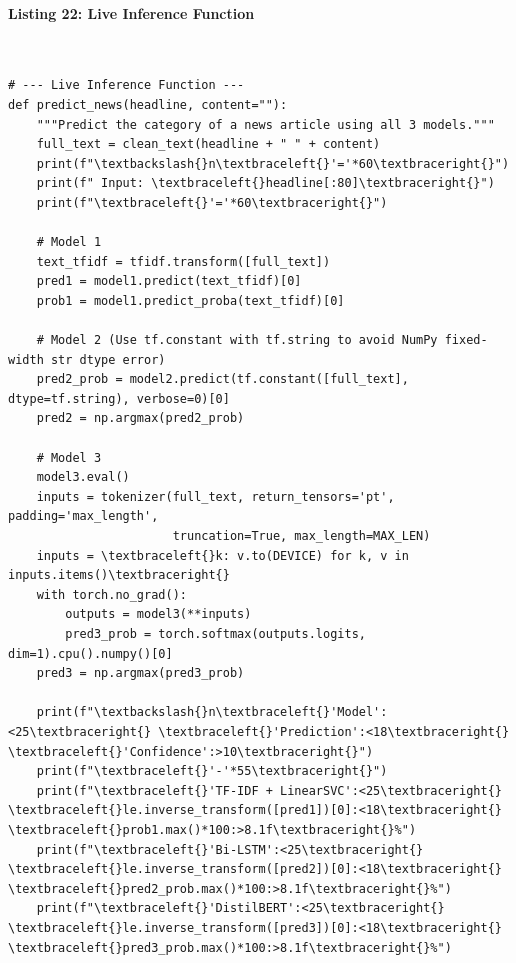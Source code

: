 \documentclass[12pt,a4paper,oneside]{report}
\begin{document}
\paragraph{Listing 22: Live Inference Function}\mbox{}\\[-1ex]
\begin{Verbatim}[commandchars=\\\{\},breaklines=true,breakanywhere=true,fontsize=\scriptsize,frame=leftline,framesep=2mm,rulecolor=\color{gray}]
# --- Live Inference Function ---
def predict_news(headline, content=""):
    """Predict the category of a news article using all 3 models."""
    full_text = clean_text(headline + " " + content)
    print(f"\textbackslash{}n\textbraceleft{}'='*60\textbraceright{}")
    print(f" Input: \textbraceleft{}headline[:80]\textbraceright{}")
    print(f"\textbraceleft{}'='*60\textbraceright{}")

    # Model 1
    text_tfidf = tfidf.transform([full_text])
    pred1 = model1.predict(text_tfidf)[0]
    prob1 = model1.predict_proba(text_tfidf)[0]

    # Model 2 (Use tf.constant with tf.string to avoid NumPy fixed-width str dtype error)
    pred2_prob = model2.predict(tf.constant([full_text], dtype=tf.string), verbose=0)[0]
    pred2 = np.argmax(pred2_prob)

    # Model 3
    model3.eval()
    inputs = tokenizer(full_text, return_tensors='pt', padding='max_length',
                       truncation=True, max_length=MAX_LEN)
    inputs = \textbraceleft{}k: v.to(DEVICE) for k, v in inputs.items()\textbraceright{}
    with torch.no_grad():
        outputs = model3(**inputs)
        pred3_prob = torch.softmax(outputs.logits, dim=1).cpu().numpy()[0]
    pred3 = np.argmax(pred3_prob)

    print(f"\textbackslash{}n\textbraceleft{}'Model':<25\textbraceright{} \textbraceleft{}'Prediction':<18\textbraceright{} \textbraceleft{}'Confidence':>10\textbraceright{}")
    print(f"\textbraceleft{}'-'*55\textbraceright{}")
    print(f"\textbraceleft{}'TF-IDF + LinearSVC':<25\textbraceright{} \textbraceleft{}le.inverse_transform([pred1])[0]:<18\textbraceright{} \textbraceleft{}prob1.max()*100:>8.1f\textbraceright{}%")
    print(f"\textbraceleft{}'Bi-LSTM':<25\textbraceright{} \textbraceleft{}le.inverse_transform([pred2])[0]:<18\textbraceright{} \textbraceleft{}pred2_prob.max()*100:>8.1f\textbraceright{}%")
    print(f"\textbraceleft{}'DistilBERT':<25\textbraceright{} \textbraceleft{}le.inverse_transform([pred3])[0]:<18\textbraceright{} \textbraceleft{}pred3_prob.max()*100:>8.1f\textbraceright{}%")


\end{Verbatim}
\end{document}
